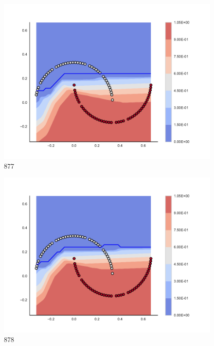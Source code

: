 \begin{subfigure}[b]{0.09\textwidth}
    \includegraphics[clip, trim=2.35cm 1.75cm 4.5cm 0cm,width=\textwidth]{img/convergence/877.pdf}
    \caption{877}
    \label{fig:convergence_877}
\end{subfigure}
%
\begin{subfigure}[b]{0.09\textwidth}
    \includegraphics[clip, trim=2.35cm 1.75cm 4.5cm 0cm,width=\textwidth]{img/convergence/878.pdf}
    \caption{878}
    \label{fig:convergence_878}
\end{subfigure}
%
